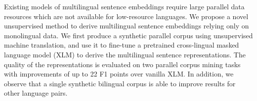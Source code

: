 Existing models of multilingual sentence embeddings require large parallel data resources which are not available for low-resource languages. We propose a novel unsupervised method to derive multilingual sentence embeddings relying only on monolingual data. We first produce a synthetic parallel corpus using unsupervised machine translation, and use it to fine-tune a pretrained cross-lingual masked language model (XLM) to derive the multilingual sentence representations. The quality of the representations is evaluated on two parallel corpus mining tasks with improvements of up to 22 F1 points over vanilla XLM. In addition, we observe that a single synthetic bilingual corpus is able to improve results for other language pairs.
